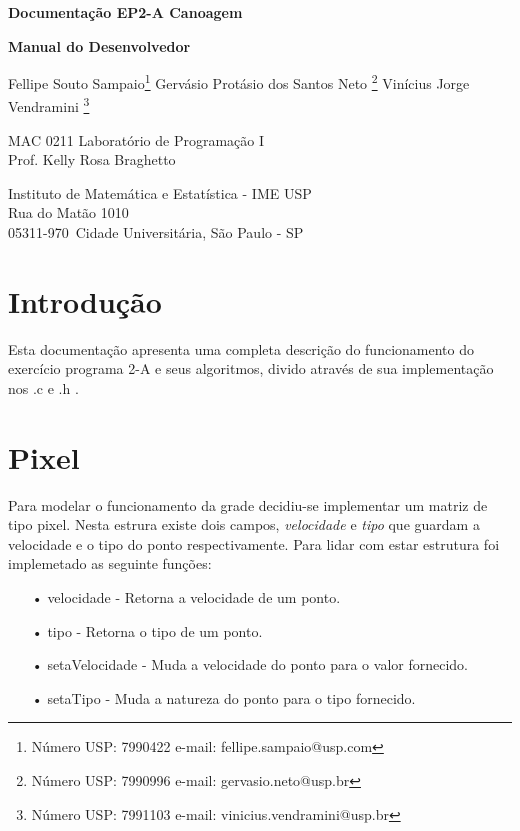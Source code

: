 \documentclass[a4paper,11pt]{article}
\begin{document}
\begin{center}{\Large \bf Documenta\c{c}ão EP2-A Canoagem \\ }\end{center}
\begin{center}{\Large \bf Manual do Desenvolvedor\\ }\end{center}

\begin{center}
{
Fellipe Souto Sampaio\footnote{Número USP: 7990422 e-mail: fellipe.sampaio@usp.com}
Gervásio Protásio dos Santos Neto \footnote{Número USP: 7990996 e-mail: gervasio.neto@usp.br}
Vinícius Jorge Vendramini \footnote{Número USP: 7991103 e-mail: vinicius.vendramini@usp.br}
}

\end{center}

\begin{center}
MAC 0211 Laboratório de Programa\c{c}ão I \\
Prof. Kelly Rosa Braghetto \\
             
\end{center}

\begin{center}
Instituto de Matemática e Estatística - IME USP \\
 Rua do Matão 1010 \\
 05311-970\, Cidade Universitária, São Paulo - SP \\
\end{center}

\newpage

\section{Introdu\c{c}ão}
Esta documenta\c{c}ão apresenta uma completa descri\c{c}ão do funcionamento do exercício programa 2-A e seus algoritmos, divido através de sua implementa\c{c}ão nos .c e .h .

\section{Pixel}
Para modelar o funcionamento da grade decidiu-se implementar um matriz de tipo pixel. Nesta estrura existe dois campos, \textit{velocidade} e \textit{tipo} que guardam a velocidade e o tipo do ponto respectivamente. Para lidar com estar estrutura foi implemetado as seguinte fun\c{c}ões:
\begin{enumerate}
\item[•]{velocidade - Retorna a velocidade de um ponto.}
\item[•]{tipo - Retorna o tipo de um ponto.} 
\item[•]{setaVelocidade - Muda a velocidade do ponto para o valor fornecido.} 
\item[•]{setaTipo - Muda a natureza do ponto para o tipo fornecido.} 

\end{enumerate}
\end{document}
